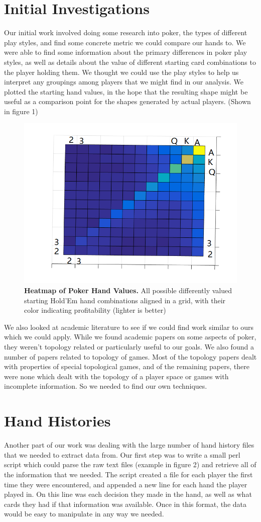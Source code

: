 \documentclass[11pt]{article}
\begin{document}
\section*{Initial Investigations}
Our initial work involved doing some research into poker, the types of different
play styles, and find some concrete metric we could compare our hands to.  We were
able to find some information about the primary differences in poker play styles,
as well as details about the value of different starting card combinations to the
player holding them. We thought we could use the play styles to help us interpret
any groupings among players that we might find in our analysis. We plotted the
starting hand values, in the hope that the resulting shape might be useful
as a comparison point for the shapes generated by actual players. (Shown in figure
1)

\begin{figure}[ht!]
		\includegraphics[width=.45\textwidth]{score}
  		\caption{\textbf{Heatmap of Poker Hand Values.} All possible differently 
  		valued starting Hold'Em hand combinations aligned in a grid, with 
  		their color indicating profitability (lighter is better)}
\end{figure}

We also
looked at academic literature to see if we could find work similar to ours which
we could apply. While we found academic papers on some aspects of poker, they
weren't topology related or particularly useful to our goals. We also found a
number of papers related to topology of games. Most of the topology papers dealt
with properties of special topological games, and of the remaining papers, there
were none which dealt with the topology of a player space or games with incomplete
information. So we needed to find our own techniques.

\section*{Hand Histories}
Another part of our work was dealing with the large number of hand history files
that we needed to extract data from. Our first step was to write a small perl
script which could parse the raw text files (example in figure 2) and retrieve
all of the information that we needed. The script created a file for each player
the first time they were encountered, and appended a new line for each hand the
player played in. On this line was each decision they made in the hand, as well
as what cards they had if that information was available. Once in this format,
the data would be easy to manipulate in any way we needed.
\end{document}
